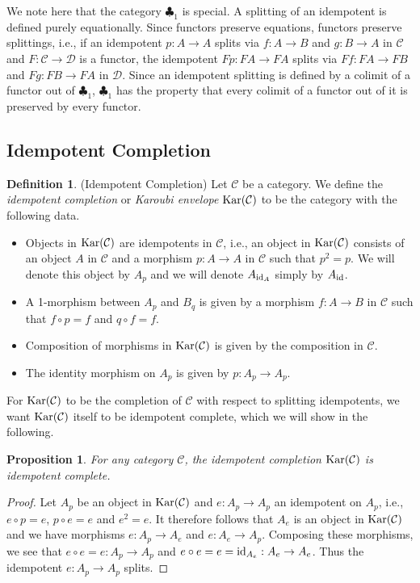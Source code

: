 \documentclass[12pt,oneside,reqno,a4paper]{article}
\newtheorem{proposition}[theorem]{Proposition}
\theoremstyle{definition}
\newtheorem{definition}[theorem]{Definition}
\newcommand{\clb}{\clubsuit}
\newcommand{\Kar}[1]{\textup{Kar}(#1)}
\newcommand{\id}{\textup{id}}
\newcommand{\C}{\mathcal{C}}
\newcommand{\D}{\mathcal{D}}
\begin{document}
We note here that the category $\clb_1$ is special. A splitting of an idempotent is defined purely equationally. Since functors preserve equations, functors preserve splittings, i.e., if an idempotent $p:A\to A$ splits via $f:A\to B$ and $g:B\to A$ in $\C$ and $F:\C\to\D$ is a functor, the idempotent $Fp:FA\to FA$ splits via $Ff:FA\to FB$ and $Fg:FB\to FA$ in $\D$. Since an idempotent splitting is defined by a colimit of a functor out of $\clb_1$, $\clb_1$ has the property that every colimit of a functor out of it is preserved by every functor.

\subsection{Idempotent Completion}

\begin{definition}{(Idempotent Completion)}
Let $\C$ be a category. We define the \textit{idempotent completion} or \textit{Karoubi envelope} $\Kar{\C}$ to be the category with the following data.
\begin{itemize}
	\item Objects in $\Kar{\C}$ are idempotents in $\C$, i.e., an object in $\Kar{\C}$ consists of an object $A$ in $\C$ and a morphism $p:A\to A$ in $\C$ such that $p^2=p$. We will denote this object by $A_p$ and we will denote $A_{\id_A}$ simply by $A_{\id}$.
	\item A 1-morphism between $A_p$ and $B_q$ is given by a morphism $f:A\to B$ in $\C$ such that $f\circ p=f$ and $q\circ f=f$.
	\item Composition of morphisms in $\Kar{\C}$ is given by the composition in $\C$.
	\item The identity morphism on $A_p$ is given by $p:A_p\to A_p$. 
\end{itemize}
\end{definition}

For $\Kar{\C}$ to be the completion of $\C$ with respect to splitting idempotents, we want $\Kar{\C}$ itself to be idempotent complete, which we will show in the following.

\begin{proposition} \label{kar1com}
For any category $\C$, the idempotent completion $\Kar{\C}$ is idempotent complete.
\end{proposition} 

\begin{proof}
Let $A_p$ be an object in $\Kar{\C}$ and $e:A_p \to A_p$ an idempotent on $A_p$, i.e., $e\circ p=e$, $p\circ e=e$ and $e^2=e$. It therefore follows that $A_e$ is an object in $\Kar{\C}$ and we have morphisms $e:A_p\to A_e$ and $e:A_e\to A_p$. Composing these morphisms, we see that $e\circ e=e:A_p\to A_p$ and $e\circ e=e=\id_{A_e}:A_e\to A_e$. Thus the idempotent $e:A_p\to A_p$ splits.
\end{proof}
\end{document}
